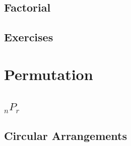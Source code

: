 \subsection{Factorial}
\subsection{Exercises}

\newpage
\section{Permutation}
\noindent{}
\subsection{$_nP_r$}
\subsection{Circular Arrangements}
